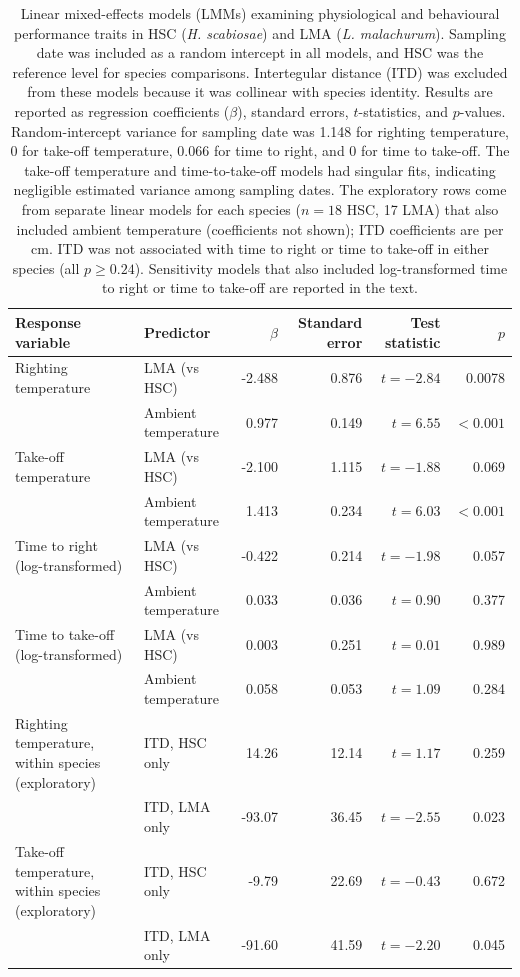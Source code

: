 \documentclass[11pt,a4paper]{article}
\begin{document}
\begin{table}[!htbp]
\centering
\caption{Linear mixed-effects models (LMMs) examining physiological and behavioural performance traits in HSC (\textit{H. scabiosae}) and LMA (\textit{L. malachurum}). Sampling date was included as a random intercept in all models, and HSC was the reference level for species comparisons. Intertegular distance (ITD) was excluded from these models because it was collinear with species identity. Results are reported as regression coefficients ($\beta$), standard errors, $t$-statistics, and $p$-values. Random-intercept variance for sampling date was 1.148 for righting temperature, 0 for take-off temperature, 0.066 for time to right, and 0 for time to take-off. The take-off temperature and time-to-take-off models had singular fits, indicating negligible estimated variance among sampling dates. The exploratory rows come from separate linear models for each species ($n = 18$ HSC, 17 LMA) that also included ambient temperature (coefficients not shown); ITD coefficients are per cm. ITD was not associated with time to right or time to take-off in either species (all $p \geq 0.24$). Sensitivity models that also included log-transformed time to right or time to take-off are reported in the text.}
\label{tab:physiology_models}

\normalsize
\renewcommand{\arraystretch}{1.15}

\begin{tabular}{llrrrr}
\toprule
Response variable & Predictor & $\beta$ & Standard error & Test statistic & $p$ \\
\midrule
Righting temperature
& LMA (vs HSC) & -2.488 & 0.876 & $t=-2.84$ & 0.0078 \\
& Ambient temperature & 0.977 & 0.149 & $t=6.55$ & $<0.001$ \\
\midrule
Take-off temperature
& LMA (vs HSC) & -2.100 & 1.115 & $t=-1.88$ & 0.069 \\
& Ambient temperature & 1.413 & 0.234 & $t=6.03$ & $<0.001$ \\
\midrule
Time to right (log-transformed)
& LMA (vs HSC) & -0.422 & 0.214 & $t=-1.98$ & 0.057 \\
& Ambient temperature & 0.033 & 0.036 & $t=0.90$ & 0.377 \\
\midrule
Time to take-off (log-transformed)
& LMA (vs HSC) & 0.003 & 0.251 & $t=0.01$ & 0.989 \\
& Ambient temperature & 0.058 & 0.053 & $t=1.09$ & 0.284 \\
\midrule
Righting temperature, within species (exploratory)
& ITD, HSC only & 14.26 & 12.14 & $t=1.17$ & 0.259 \\
& ITD, LMA only & -93.07 & 36.45 & $t=-2.55$ & 0.023 \\
\midrule
Take-off temperature, within species (exploratory)
& ITD, HSC only & -9.79 & 22.69 & $t=-0.43$ & 0.672 \\
& ITD, LMA only & -91.60 & 41.59 & $t=-2.20$ & 0.045 \\
\bottomrule
\end{tabular}
\end{table}
\end{document}

